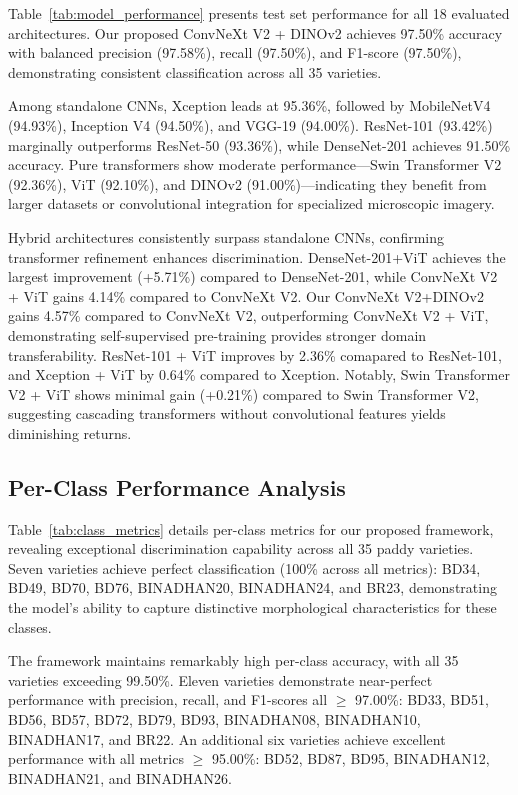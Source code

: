 \documentclass[conference]{IEEEtran}
\begin{document}
Table~\ref{tab:model_performance} presents test set performance for all 18 evaluated architectures. Our proposed ConvNeXt V2 + DINOv2 achieves 97.50\% accuracy with balanced precision (97.58\%), recall (97.50\%), and F1-score (97.50\%), demonstrating consistent classification across all 35 varieties.

Among standalone CNNs, Xception leads at 95.36\%, followed by MobileNetV4 (94.93\%), Inception V4 (94.50\%), and VGG-19 (94.00\%). ResNet-101 (93.42\%) marginally outperforms ResNet-50 (93.36\%), while DenseNet-201 achieves 91.50\% accuracy. Pure transformers show moderate performance—Swin Transformer V2 (92.36\%), ViT (92.10\%), and DINOv2 (91.00\%)—indicating they benefit from larger datasets or convolutional integration for specialized microscopic imagery.

Hybrid architectures consistently surpass standalone CNNs, confirming transformer refinement enhances discrimination. DenseNet-201+ViT achieves the largest improvement (+5.71\%) compared to DenseNet-201, while ConvNeXt V2 + ViT gains 4.14\% compared to ConvNeXt V2. Our ConvNeXt V2+DINOv2 gains 4.57\% compared to ConvNeXt V2, outperforming ConvNeXt V2 + ViT, demonstrating self-supervised pre-training provides stronger domain transferability. ResNet-101 + ViT improves by 2.36\% comapared to  ResNet-101, and Xception + ViT by 0.64\% compared to Xception. Notably, Swin Transformer V2 + ViT shows minimal gain (+0.21\%) compared to Swin Transformer V2, suggesting cascading transformers without convolutional features yields diminishing returns.

\subsection{Per-Class Performance Analysis}

Table~\ref{tab:class_metrics} details per-class metrics for our proposed framework, revealing exceptional discrimination capability across all 35 paddy varieties. Seven varieties achieve perfect classification (100\% across all metrics): BD34, BD49, BD70, BD76, BINADHAN20, BINADHAN24, and BR23, demonstrating the model's ability to capture distinctive morphological characteristics for these classes.

The framework maintains remarkably high per-class accuracy, with all 35 varieties exceeding 99.50\%. Eleven varieties demonstrate near-perfect performance with precision, recall, and F1-scores all $\geq$ 97.00\%: BD33, BD51, BD56, BD57, BD72, BD79, BD93, BINADHAN08, BINADHAN10, BINADHAN17, and BR22. An additional six varieties achieve excellent performance with all metrics $\geq$ 95.00\%: BD52, BD87, BD95, BINADHAN12, BINADHAN21, and BINADHAN26.
\end{document}
